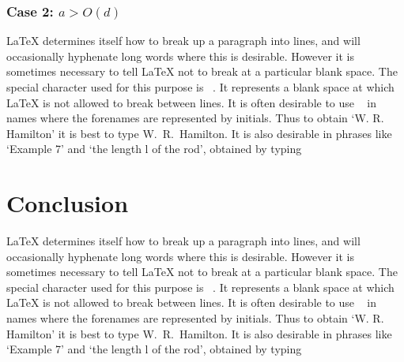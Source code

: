 \documentclass[12pt]{report}
\begin{document}
\subsection{Case 2: $a > O(d)$}

LaTeX determines itself how to break up a paragraph into lines, and will occasionally hyphenate long words where this is desirable. However it is sometimes necessary to tell LaTeX not to break at a particular blank space. The special character used for this purpose is ~. It represents a blank space at which LaTeX is not allowed to break between lines. It is often desirable to use ~ in names where the forenames are represented by initials. Thus to obtain `W. R. Hamilton' it is best to type W.~R.~Hamilton. It is also desirable in phrases like `Example 7' and `the length l of the rod', obtained by typing



\chapter{Conclusion}

LaTeX determines itself how to break up a paragraph into lines, and will occasionally hyphenate long words where this is desirable. However it is sometimes necessary to tell LaTeX not to break at a particular blank space. The special character used for this purpose is ~. It represents a blank space at which LaTeX is not allowed to break between lines. It is often desirable to use ~ in names where the forenames are represented by initials. Thus to obtain `W. R. Hamilton' it is best to type W.~R.~Hamilton. It is also desirable in phrases like `Example 7' and `the length l of the rod', obtained by typing


\end{document}
